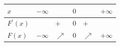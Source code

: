 \documentclass[border=.4pt]{standalone}
\begin{document}
\color{ink}\begin{tabular}{|>{\centering\arraybackslash}m{1.7cm}|>{\centering\arraybackslash}m{1.25cm}|>{\centering\arraybackslash}m{1.25cm}|>{\centering\arraybackslash}m{1.25cm}|>{\centering\arraybackslash}m{1.25cm}|>{\centering\arraybackslash}m{1.25cm}|}\hline
\cellcolor{head}$x$ & \cellcolor{head}$-\infty$ & \cellcolor{head} & \cellcolor{head}$0$ & \cellcolor{head} & \cellcolor{head}$+\infty$ \\ \hline
\cellcolor{head}$F^{\prime}(x)$ &  & $+$ & $0$ & $+$ &  \\ \hline
\cellcolor{head}$F(x)$ & $-\infty$ & \color{focus}\large $\nearrow$ & $0$ & \color{focus}\large $\nearrow$ & $+\infty$ \\ \hline\end{tabular}
\end{document}
